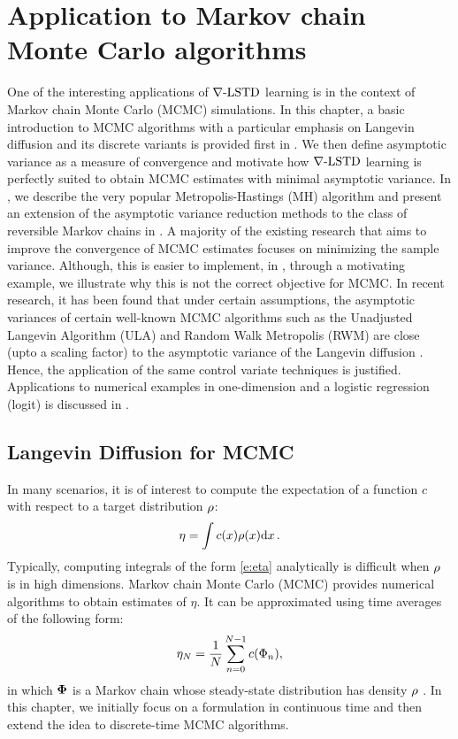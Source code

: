 \chapter{Application to Markov chain Monte Carlo algorithms}
\label{ch:mcmc}
One of the interesting applications of $\nabla\text{-LSTD}$ learning is in the context of Markov chain Monte Carlo (MCMC) simulations. In this chapter, a basic introduction to MCMC algorithms with a particular emphasis on Langevin diffusion and its discrete variants is provided first in . We then define asymptotic variance as a measure of convergence and motivate how $\nabla\text{-LSTD}$ learning is perfectly suited to obtain MCMC estimates with minimal asymptotic variance. In , we describe the very popular Metropolis-Hastings (MH) algorithm and present an extension of the asymptotic variance reduction methods to the class of reversible Markov chains in . A majority of the existing research that aims to improve the convergence of MCMC estimates focuses on minimizing the sample variance. Although, this is easier to implement, in , through a motivating example, we illustrate why this is not the correct objective for MCMC. 
In recent research, it has been found that under certain assumptions, the asymptotic variances of certain well-known MCMC algorithms such as the Unadjusted Langevin Algorithm (ULA) and Random Walk Metropolis (RWM) are close (upto a scaling factor) to the asymptotic variance of the Langevin diffusion \cite{brodurmeymourad18}. Hence, the application of the same control variate techniques is justified.  Applications to numerical examples in one-dimension and a logistic regression (logit) is discussed in . 
\section{Langevin Diffusion for MCMC}
\label{s:mcmc_langevin}
In many scenarios, it is of interest to compute the expectation of a function $c$ with respect to a target distribution $\rho$:
\begin{equation}
\eta = \int c(x)\pr(x)\ud x\, .
\label{e:eta}
\end{equation} 
Typically, computing integrals of the form \eqref{e:eta} analytically is difficult when $\rho$ is in high dimensions. Markov chain Monte Carlo (MCMC) provides numerical algorithms to obtain estimates of $\eta$. It can be approximated using time averages of the following form:
\begin{equation}
\eta_N =\frac{1}{N}\sum_{n=0}^{N-1} c(\markovstate_n),
\label{e:sample_mean_HM}
\end{equation}
in which $\boldsymbol{\Phi}$ is a Markov chain whose steady-state distribution has density $\rho$ \cite{asmgly07,MT}.
In this chapter, we initially focus on a formulation in continuous time and then extend the idea to discrete-time MCMC algorithms.

